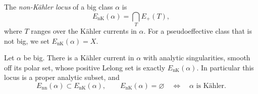\begin{definition}\label{def:bc-non-kahler-locus}
The \emph{non-K\"ahler locus} of a big class $\alpha$ is
\[
 E_{\mathrm{nK}}(\alpha)=\bigcap_{T}E_+(T),
\]
where $T$ ranges over the K\"ahler currents in $\alpha$. For a pseudoeffective class that is not big, we set $E_{\mathrm{nK}}(\alpha)=X$.
\end{definition}

\begin{theorem}\label{thm:bc-non-kahler-locus}
Let $\alpha$ be big. There is a K\"ahler current in $\alpha$ with analytic singularities, smooth off its polar set, whose positive Lelong set is exactly $E_{\mathrm{nK}}(\alpha)$. In particular this locus is a proper analytic subset, and
\[
 E_{\mathrm{nn}}(\alpha)\subset E_{\mathrm{nK}}(\alpha),
 \qquad
 E_{\mathrm{nK}}(\alpha)=\varnothing
 \quad\Longleftrightarrow\quad\alpha\text{ is K\"ahler}.
\]
\end{theorem}
